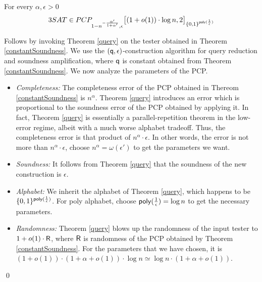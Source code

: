 \begin{theorem}\label{main} 
For every $\alpha , \epsilon > 0$
\[
  3SAT \in PCP_{{1 - {n^{-\frac{\alpha'} {1 + \alpha'}}}}, \epsilon } \big[ (1 + o(1)) \cdot \log n,  2 \big ]_{\{0,1\}^{{\sf poly}(\frac{1}{\epsilon})}}
\]

\end{theorem}
 Follows by invoking Theorem \ref{query} on the
tester obtained in Theorem \ref{constantSoundness}. We 
use the $( {\sf q}, \epsilon)$-construction algorithm for query
reduction and soundness amplification, where ${\sf q}$ is constant obtained
from Theorem \ref{constantSoundness}. We now analyze the parameters
of the PCP.
\begin{itemize}

\item {\em Completeness:} The completeness error of the PCP
  obtained in Thereom \ref{constantSoundness} is $n^\alpha$. Theorem \ref{query}
  introduces an error which is proportional to the soundness error of
  the PCP obtained by applying it. In fact, Theorem \ref{query} is
  essentially a parallel-repetition theorem in the low-error regime,
  albeit with a much worse alphabet tradeoff. Thus, the completeness
  error is that product of $n^\alpha \cdot \epsilon$. In other words,
  the error is not more than $n^{\alpha} \cdot \epsilon$, choose $ n^\alpha =
  \omega(\epsilon')$ to get the parameters we want.

\item {\em Soundness:} It follows from Theorem \ref{query} that the
  soundness of the new construction is $\epsilon$.

\item {\em Alphabet:} We inherit the alphabet of Theorem \ref{query},
  which happens to be $\{0,1\}^{{\sf poly}(\frac{1}{\epsilon})}$.
For poly alphabet, choose ${{\sf poly}(\frac{1}{\epsilon})} = \log n$ to get the 
necessary parameters.

\item {\em Randomness:} Theorem \ref{query} blows up the randomness of
  the input tester to ${1 + o(1)} \cdot {\sf R}$, where ${\sf R}$ is
  randomness of the PCP obtained by Theorem \ref{constantSoundness}. For the
  parameters that we have chosen, it is $(1 + o(1))  \cdot (1 + \alpha + o(1)) \cdot \log n   
\simeq  \log n \cdot (1 +  \alpha + o(1))$.
\end{itemize}
\qed


